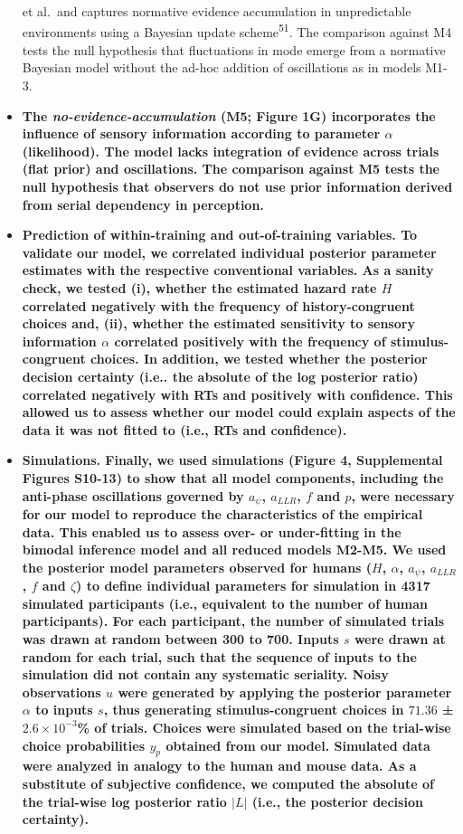 \documentclass[
]{article}
\begin{document}
\begin{itemize}
{  et al.~and captures normative evidence accumulation in unpredictable
  environments using a Bayesian update scheme\textsuperscript{51}. The
  comparison against M4 tests the null hypothesis that fluctuations in
  mode emerge from a normative Bayesian model without the ad-hoc
  addition of oscillations as in models M1-3.}
\item
  \textbf{The \emph{no-evidence-accumulation} (M5; Figure 1G)
  incorporates the influence of sensory information according to
  parameter \(\alpha\) (likelihood). The model lacks integration of
  evidence across trials (flat prior) and oscillations. The comparison
  against M5 tests the null hypothesis that observers do not use prior
  information derived from serial dependency in perception.}
\item
  \textbf{Prediction of within-training and out-of-training variables.
  To validate our model, we correlated individual posterior parameter
  estimates with the respective conventional variables. As a sanity
  check, we tested (i), whether the estimated hazard rate \(H\)
  correlated negatively with the frequency of history-congruent choices
  and, (ii), whether the estimated sensitivity to sensory information
  \(\alpha\) correlated positively with the frequency of
  stimulus-congruent choices. In addition, we tested whether the
  posterior decision certainty (i.e.. the absolute of the log posterior
  ratio) correlated negatively with RTs and positively with confidence.
  This allowed us to assess whether our model could explain aspects of
  the data it was not fitted to (i.e., RTs and confidence).}
\item
  \textbf{Simulations. Finally, we used simulations (Figure 4,
  Supplemental Figures S10-13) to show that all model components,
  including the anti-phase oscillations governed by \(a_{\psi}\),
  \(a_{LLR}\), \(f\) and \(p\), were necessary for our model to
  reproduce the characteristics of the empirical data. This enabled us
  to assess over- or under-fitting in the bimodal inference model and
  all reduced models M2-M5. We used the posterior model parameters
  observed for humans (\(H\), \(\alpha\), \(a_{\psi}\), \(a_{LLR}\),
  \(f\) and \(\zeta\)) to define individual parameters for simulation in
  4317 simulated participants (i.e., equivalent to the number of human
  participants). For each participant, the number of simulated trials
  was drawn at random between 300 to 700. Inputs \(s\) were drawn at
  random for each trial, such that the sequence of inputs to the
  simulation did not contain any systematic seriality. Noisy
  observations \(u\) were generated by applying the posterior parameter
  \(\alpha\) to inputs \(s\), thus generating stimulus-congruent choices
  in \(71.36\) ± \(\ensuremath{2.6\times 10^{-3}}\)\% of trials. Choices
  were simulated based on the trial-wise choice probabilities \(y_{p}\)
  obtained from our model. Simulated data were analyzed in analogy to
  the human and mouse data. As a substitute of subjective confidence, we
  computed the absolute of the trial-wise log posterior ratio \(|L|\)
  (i.e., the posterior decision certainty).}
\end{itemize}
\end{document}
